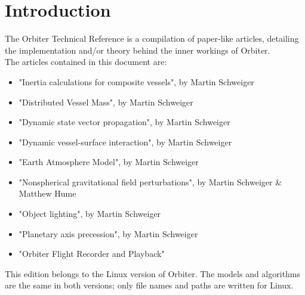 \documentclass[Orbiter Technical Reference.tex]{subfiles}
\begin{document}
\section{Introduction}
The Orbiter Technical Reference is a compilation of paper-like articles, detailing the implementation and/or theory behind the inner workings of Orbiter.\\
The articles contained in this document are:

\begin{itemize}
\item "Inertia calculations for composite vessels", by Martin Schweiger
\item "Distributed Vessel Mass", by Martin Schweiger
\item "Dynamic state vector propagation", by Martin Schweiger
\item "Dynamic vessel-surface interaction", by Martin Schweiger
\item "Earth Atmosphere Model", by Martin Schweiger
\item "Nonspherical gravitational field perturbations", by Martin Schweiger \& Matthew Hume
\item "Object lighting", by Martin Schweiger
\item "Planetary axis precession", by Martin Schweiger
\item "Orbiter Flight Recorder and Playback"
\end{itemize}

\noindent
This edition belongs to the Linux version of Orbiter. The models and algorithms are the same in both versions; only file names and paths are written for Linux.
\end{document}
